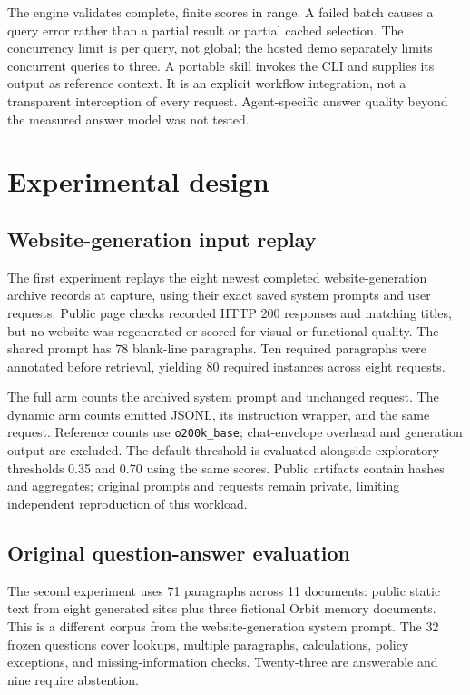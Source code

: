 \documentclass[11pt]{article}
\begin{document}
The engine validates complete, finite scores in range. A failed batch causes a query error rather than a partial result or partial cached selection. The concurrency limit is per query, not global; the hosted demo separately limits concurrent queries to three. A portable skill invokes the CLI and supplies its output as reference context. It is an explicit workflow integration, not a transparent interception of every request. Agent-specific answer quality beyond the measured answer model was not tested.

\section{Experimental design}
\subsection{Website-generation input replay}
The first experiment replays the eight newest completed website-generation archive records at capture, using their exact saved system prompts and user requests. Public page checks recorded HTTP 200 responses and matching titles, but no website was regenerated or scored for visual or functional quality. The shared prompt has 78 blank-line paragraphs. Ten required paragraphs were annotated before retrieval, yielding 80 required instances across eight requests.

The full arm counts the archived system prompt and unchanged request. The dynamic arm counts emitted JSONL, its instruction wrapper, and the same request. Reference counts use \texttt{o200k\_base}; chat-envelope overhead and generation output are excluded. The default threshold is evaluated alongside exploratory thresholds 0.35 and 0.70 using the same scores. Public artifacts contain hashes and aggregates; original prompts and requests remain private, limiting independent reproduction of this workload.

\subsection{Original question-answer evaluation}
The second experiment uses 71 paragraphs across 11 documents: public static text from eight generated sites plus three fictional Orbit memory documents. This is a different corpus from the website-generation system prompt. The 32 frozen questions cover lookups, multiple paragraphs, calculations, policy exceptions, and missing-information checks. Twenty-three are answerable and nine require abstention.
\end{document}
